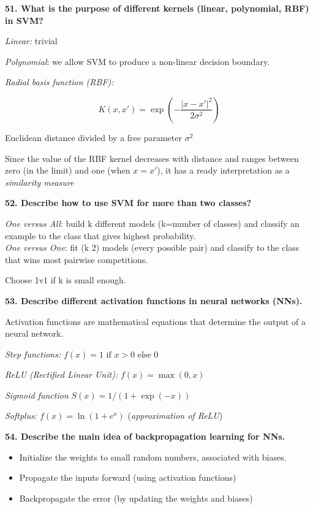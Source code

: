 \textbf{51. What is the purpose of different kernels (linear,
polynomial, RBF) in SVM?}

\textit{Linear:} trivial

\textit{Polynomial}: we allow SVM to produce a non-linear decision
boundary.

\textit{Radial basis function (RBF):}

\[ K(x, x') = \exp \left( - \frac{ | x - x' | ^2 }{ 2\sigma^2} \right) \]

Euclidean distance divided by a free parameter $\sigma^2$

Since the value of the RBF kernel decreases with distance and ranges
between zero (in the limit) and one (when $x = x'$), it has a ready
interpretation as a \textit{similarity measure}

\textbf{52. Describe how to use SVM for more than two classes?}

\textit{One versus All}: build k different models (k=number of
classes) and classify an example to the class that gives highest
probability.\\
\textit{One versus One}: fit (k 2) models (every possible pair) and
classify to the class that wins most pairwise competitions.

Choose 1v1 if k is small enough.

\textbf{53. Describe different activation functions in neural networks
(NNs).}

Activation functions are mathematical equations that determine the
output of a neural network.

\textit{Step functions:} $f(x) = {1 \text{ if } x > 0 \text{ else } 0}$

\textit{ReLU (Rectified Linear Unit):} $f(x) = \max(0, x)$

\textit{Sigmoid function} $ S(x) = 1/(1+\exp(-x)) $

\textit{Softplus:} $f(x) = \ln(1+e^x)$ (\textit{approximation of ReLU})

\textbf{54. Describe the main idea of backpropagation learning for NNs.}

\begin{itemize}
\item Initialize the weights to small random numbers, associated with biases.
\item Propagate the inputs forward (using activation functions)
\item Backpropagate the error (by updating the weights and biases)
\end{itemize}

